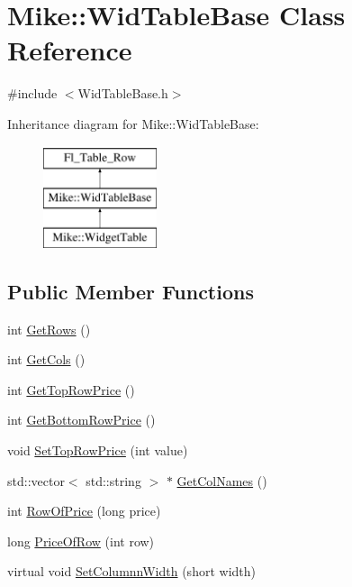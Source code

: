 \hypertarget{class_mike_1_1_wid_table_base}{}\section{Mike\+:\+:Wid\+Table\+Base Class Reference}
\label{class_mike_1_1_wid_table_base}


{\ttfamily \#include $<$Wid\+Table\+Base.\+h$>$}

Inheritance diagram for Mike\+:\+:Wid\+Table\+Base\+:\begin{figure}[H]
\begin{center}
\leavevmode
\includegraphics[height=3.000000cm]{class_mike_1_1_wid_table_base}
\end{center}
\end{figure}
\subsection*{Public Member Functions}
\begin{DoxyCompactItemize}
\item 
int \hyperlink{class_mike_1_1_wid_table_base_abdc666dec8fa95e8e6232c9eae6ee8e2}{Get\+Rows} ()
\item 
int \hyperlink{class_mike_1_1_wid_table_base_afac57108a679ea7b3800ab8a14e80209}{Get\+Cols} ()
\item 
int \hyperlink{class_mike_1_1_wid_table_base_ab9f884cfed7ee50f7037bf1e75258f11}{Get\+Top\+Row\+Price} ()
\item 
int \hyperlink{class_mike_1_1_wid_table_base_af29863e5a1695c64a748133b335ecc16}{Get\+Bottom\+Row\+Price} ()
\item 
void \hyperlink{class_mike_1_1_wid_table_base_a456b14469434d2fffe513a9d7cc39e25}{Set\+Top\+Row\+Price} (int value)
\item 
std\+::vector$<$ std\+::string $>$ $\ast$ \hyperlink{class_mike_1_1_wid_table_base_a8fab1137b438a8ae331c9ceeaae43acb}{Get\+Col\+Names} ()
\item 
int \hyperlink{class_mike_1_1_wid_table_base_a590a250d0bb443aef98a7250555d1c68}{Row\+Of\+Price} (long price)
\item 
long \hyperlink{class_mike_1_1_wid_table_base_afb5e90634ccda27eb8f40a1f2b6208a1}{Price\+Of\+Row} (int row)
\item 
virtual void \hyperlink{class_mike_1_1_wid_table_base_a71a0e404a020f7b8d10544113c16a4ce}{Set\+Columnn\+Width} (short width)
\end{DoxyCompactItemize}
